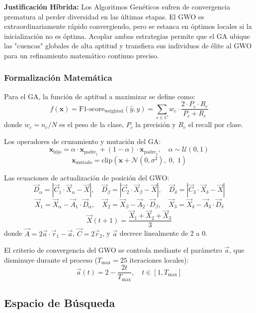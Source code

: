 \documentclass[12pt, letterpaper]{article}
\begin{document}
\textbf{Justificación Híbrida:} Los Algoritmos Genéticos sufren de convergencia prematura al perder diversidad en las últimas etapas. El GWO es extraordinariamente rápido convergiendo, pero se estanca en óptimos locales si la inicialización no es óptima. Acoplar ambas estrategias permite que el GA ubique las "cuencas" globales de alta aptitud y transfiera sus individuos de élite al GWO para un refinamiento matemático continuo preciso.

\subsubsection{Formalización Matemática}

Para el GA, la función de aptitud a maximizar se define como:
\[
f(\mathbf{x}) = \text{F1-score}_{\text{weighted}}(\hat{y}, y) = 
\sum_{c \in C} w_c \cdot \frac{2 \cdot P_c \cdot R_c}{P_c + R_c}
\]
donde $w_c = n_c / N$ es el peso de la clase, $P_c$ la precisión y $R_c$ el recall por clase.

Los operadores de cruzamiento y mutación del GA:
\[
\mathbf{x}_{\text{hijo}} = \alpha \cdot \mathbf{x}_{\text{padre}_1} + 
(1-\alpha) \cdot \mathbf{x}_{\text{padre}_2}, \quad \alpha \sim \mathcal{U}(0,1)
\]
\[
\mathbf{x}_{\text{mutado}} = \text{clip}\left(\mathbf{x} + 
\mathcal{N}(0, \sigma^2), \; 0, \; 1\right)
\]

Las ecuaciones de actualización de posición del GWO:
\[
\vec{D}_\alpha = |\vec{C}_1 \cdot \vec{X}_\alpha - \vec{X}|, \quad
\vec{D}_\beta  = |\vec{C}_2 \cdot \vec{X}_\beta  - \vec{X}|, \quad
\vec{D}_\delta = |\vec{C}_3 \cdot \vec{X}_\delta - \vec{X}|
\]
\[
\vec{X}_1 = \vec{X}_\alpha - \vec{A}_1 \cdot \vec{D}_\alpha, \quad
\vec{X}_2 = \vec{X}_\beta  - \vec{A}_2 \cdot \vec{D}_\beta,  \quad
\vec{X}_3 = \vec{X}_\delta - \vec{A}_3 \cdot \vec{D}_\delta
\]
\[
\vec{X}(t+1) = \frac{\vec{X}_1 + \vec{X}_2 + \vec{X}_3}{3}
\]
donde $\vec{A} = 2\vec{a} \cdot \vec{r}_1 - \vec{a}$, 
$\vec{C} = 2\vec{r}_2$, y $\vec{a}$ decrece linealmente de 2 a 0.

El criterio de convergencia del GWO se controla mediante el parámetro $\vec{a}$, que disminuye durante el proceso ($T_{\max} = 25$ iteraciones locales):
\[
\vec{a}(t) = 2 - \frac{2t}{T_{\max}}, \quad t \in [1, T_{\max}]
\]

\subsection{Espacio de Búsqueda}
\end{document}
